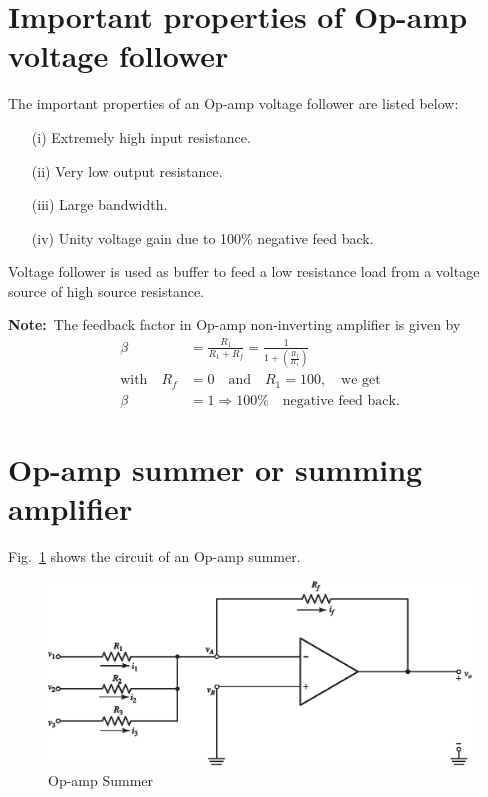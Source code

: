 \section{Important properties of Op-amp voltage follower}\label{sec5.12}

The important properties of an Op-amp voltage follower are listed below:
\begin{itemize}
\item[(i)] Extremely high input resistance.

\item[(ii)] Very low output resistance.

\item[(iii)] Large bandwidth.

\item[(iv)] Unity voltage gain due to 100\% negative feed back.
\end{itemize}


Voltage follower is used as buffer to feed a low resistance load from a voltage source of high source resistance.

\noindent
{\bf Note:}~The feedback factor in Op-amp non-inverting amplifier is given by
\begin{align*}
\beta &= \frac{R_{1}}{R_{1}+R_{f}}=\frac{1}{1+\left(\frac{R_{f}}{R_{1}}\right)}\\
\text{with}\quad R_{f} &=0 \text{~~ and~~ } R_{1}=100,\text{~~ we get}\\
\beta &= 1\Rightarrow 100\%\text{~~ negative feed back.}
\end{align*}

\section{Op-amp summer or summing amplifier}\label{sec5.13}

Fig.~\ref{fig5.14} shows the circuit of an Op-amp summer.
\begin{figure}[H]
\centering
\includegraphics{chap4/S3-EE-06-023.eps}
\caption{Op-amp Summer}\label{fig5.14}
\end{figure}

